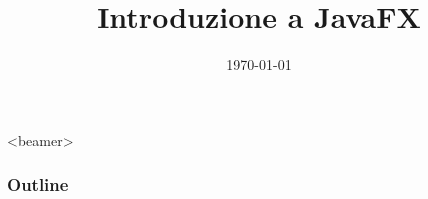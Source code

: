 \documentclass[presentation]{beamer}
\title[{\lab} -- JavaFX]{Introduzione a JavaFX}
\date[\today]{\today}
\begin{document}
\frame[label=coverpage]{\titlepage}

\begin{frame}<beamer>
 	\frametitle{Outline}
 	\tableofcontents[]
\end{frame}


%
\end{document}
